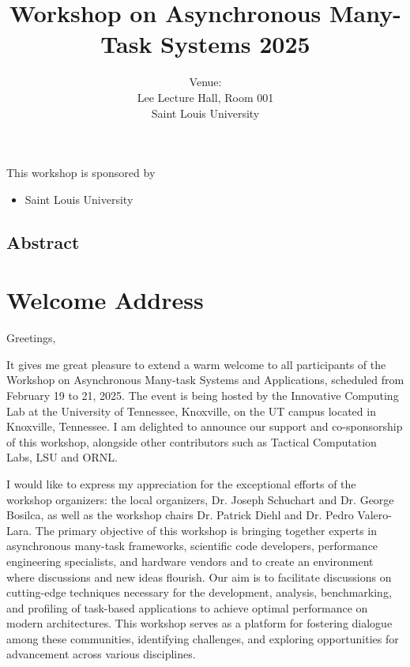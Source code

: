 \documentclass[12pt,letterpaper]{book}
\title{Workshop on Asynchronous Many-Task Systems 2025}
\author{Venue: \\ Lee Lecture Hall, Room 001\\Saint Louis University}
\begin{document}
\frontmatter

\maketitle

This workshop is sponsored by

\begin{itemize}
\item Saint Louis University 
\end{itemize}

\newpage

\section*{Abstract}


\chapter{Welcome Address}


Greetings,

\noindent It gives me great pleasure to extend a warm welcome to all participants
of the Workshop on Asynchronous Many-task Systems and Applications,
scheduled from February 19 to 21, 2025. The event is being hosted by the
Innovative Computing Lab at the University of Tennessee, Knoxville, on
the UT campus located in Knoxville, Tennessee. I am delighted to
announce our support and co-sponsorship of this workshop, alongside
other contributors such as Tactical Computation Labs, LSU and ORNL.

\noindent I would like to express my appreciation for the exceptional efforts of
the workshop organizers: the local organizers, Dr. Joseph Schuchart and
Dr. George Bosilca, as well as the workshop chairs Dr. Patrick Diehl and
Dr. Pedro Valero-Lara. The primary objective of this workshop is
bringing together experts in asynchronous many-task frameworks,
scientific code developers, performance engineering specialists, and
hardware vendors and to create an environment where discussions and new
ideas flourish. Our aim is to facilitate discussions on cutting-edge
techniques necessary for the development, analysis, benchmarking, and
profiling of task-based applications to achieve optimal performance on
modern architectures. This workshop serves as a platform for fostering
dialogue among these communities, identifying challenges, and exploring
opportunities for advancement across various disciplines.
\end{document}
